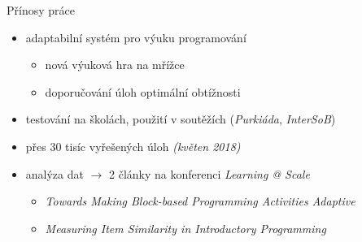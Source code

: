\documentclass[
]{beamer}
\begin{document}
\begin{frame}{Přínosy práce}
\begin{itemize}
\item adaptabilní systém pro výuku programování
  \begin{itemize}
  \item nová výuková hra na mřížce
  \item doporučování úloh optimální obtížnosti %
  \end{itemize}
\item testování na školách, použití v soutěžích (\emph{Purkiáda}, \emph{InterSoB})
\item přes 30 tisíc vyřešených úloh \emph{(květen 2018)} %
\item analýza dat $\rightarrow$ 2 články na konferenci \emph{Learning @ Scale}
  \begin{itemize}
  \item \emph{Towards Making Block-based Programming Activities Adaptive}
  \item \emph{Measuring Item Similarity in Introductory Programming}
  \end{itemize}
\end{itemize}
\end{frame}

\end{document}
